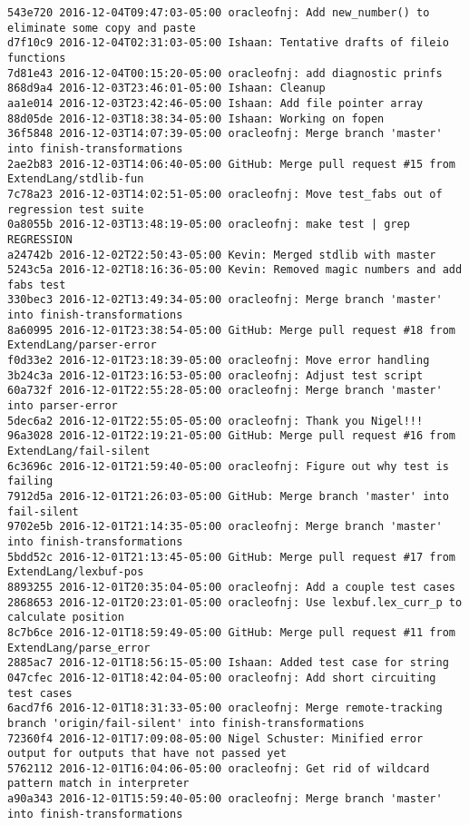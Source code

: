 \begin{lstlisting}
543e720 2016-12-04T09:47:03-05:00 oracleofnj: Add new_number() to eliminate some copy and paste
d7f10c9 2016-12-04T02:31:03-05:00 Ishaan: Tentative drafts of fileio functions
7d81e43 2016-12-04T00:15:20-05:00 oracleofnj: add diagnostic prinfs
868d9a4 2016-12-03T23:46:01-05:00 Ishaan: Cleanup
aa1e014 2016-12-03T23:42:46-05:00 Ishaan: Add file pointer array
88d05de 2016-12-03T18:38:34-05:00 Ishaan: Working on fopen
36f5848 2016-12-03T14:07:39-05:00 oracleofnj: Merge branch 'master' into finish-transformations
2ae2b83 2016-12-03T14:06:40-05:00 GitHub: Merge pull request #15 from ExtendLang/stdlib-fun
7c78a23 2016-12-03T14:02:51-05:00 oracleofnj: Move test_fabs out of regression test suite
0a8055b 2016-12-03T13:48:19-05:00 oracleofnj: make test | grep REGRESSION
a24742b 2016-12-02T22:50:43-05:00 Kevin: Merged stdlib with master
5243c5a 2016-12-02T18:16:36-05:00 Kevin: Removed magic numbers and add fabs test
330bec3 2016-12-02T13:49:34-05:00 oracleofnj: Merge branch 'master' into finish-transformations
8a60995 2016-12-01T23:38:54-05:00 GitHub: Merge pull request #18 from ExtendLang/parser-error
f0d33e2 2016-12-01T23:18:39-05:00 oracleofnj: Move error handling
3b24c3a 2016-12-01T23:16:53-05:00 oracleofnj: Adjust test script
60a732f 2016-12-01T22:55:28-05:00 oracleofnj: Merge branch 'master' into parser-error
5dec6a2 2016-12-01T22:55:05-05:00 oracleofnj: Thank you Nigel!!!
96a3028 2016-12-01T22:19:21-05:00 GitHub: Merge pull request #16 from ExtendLang/fail-silent
6c3696c 2016-12-01T21:59:40-05:00 oracleofnj: Figure out why test is failing
7912d5a 2016-12-01T21:26:03-05:00 GitHub: Merge branch 'master' into fail-silent
9702e5b 2016-12-01T21:14:35-05:00 oracleofnj: Merge branch 'master' into finish-transformations
5bdd52c 2016-12-01T21:13:45-05:00 GitHub: Merge pull request #17 from ExtendLang/lexbuf-pos
8893255 2016-12-01T20:35:04-05:00 oracleofnj: Add a couple test cases
2868653 2016-12-01T20:23:01-05:00 oracleofnj: Use lexbuf.lex_curr_p to calculate position
8c7b6ce 2016-12-01T18:59:49-05:00 GitHub: Merge pull request #11 from ExtendLang/parse_error
2885ac7 2016-12-01T18:56:15-05:00 Ishaan: Added test case for string
047cfec 2016-12-01T18:42:04-05:00 oracleofnj: Add short circuiting test cases
6acd7f6 2016-12-01T18:31:33-05:00 oracleofnj: Merge remote-tracking branch 'origin/fail-silent' into finish-transformations
72360f4 2016-12-01T17:09:08-05:00 Nigel Schuster: Minified error output for outputs that have not passed yet
5762112 2016-12-01T16:04:06-05:00 oracleofnj: Get rid of wildcard pattern match in interpreter
a90a343 2016-12-01T15:59:40-05:00 oracleofnj: Merge branch 'master' into finish-transformations

\end{lstlisting}
